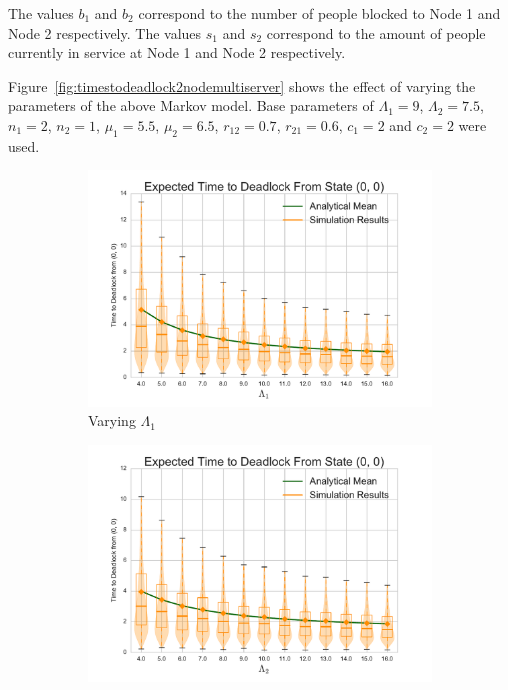 \documentclass{article}
\begin{document}
The values $b_1$ and $b_2$ correspond to the number of people blocked to Node 1 and Node 2 respectively.
The values $s_1$ and $s_2$ correspond to the amount of people currently in service at Node 1 and Node 2 respectively.

Figure~\ref{fig:timestodeadlock2nodemultiserver} shows the effect of varying the parameters of the above Markov model.
Base parameters of $\Lambda_1 = 9$, $\Lambda_2 = 7.5$, $n_1 = 2$, $n_2 = 1$, $\mu_1 = 5.5$, $\mu_2 = 6.5$, $r_{12} = 0.7$, $r_{21} = 0.6$, $c_1 = 2$ and $c_2 = 2$ were used.

\begin{figure}[!htbp]
  \begin{subfigure}[b]{0.333\textwidth}
    \includegraphics[width=\textwidth]{images/varyL1_2Nms}
    \caption{Varying $\Lambda_1$}
    \label{fig:2Nms_L1}
  \end{subfigure}
  \begin{subfigure}[b]{0.333\textwidth}
    \includegraphics[width=\textwidth]{images/varyL2_2Nms}

\end{subfigure}
\end{figure}
\end{document}
